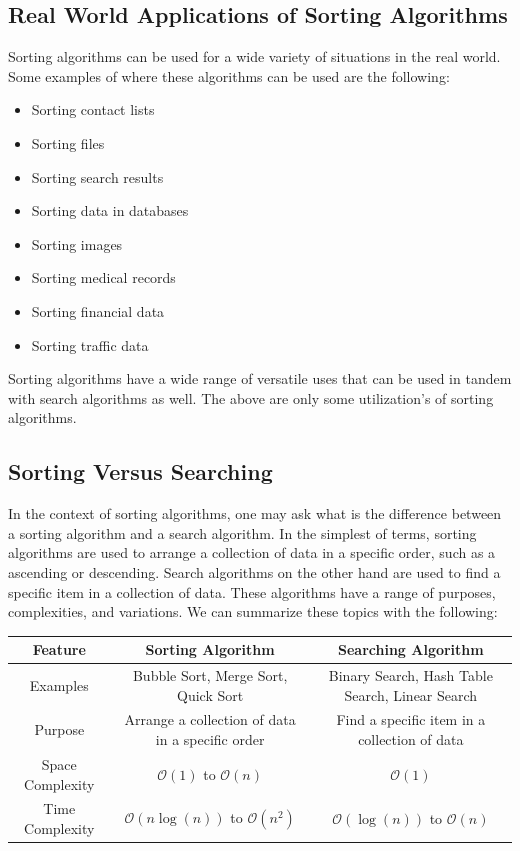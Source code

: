 \documentclass[a4paper,9pt]{article}
\begin{document}
\subsection*{Real World Applications of Sorting Algorithms}

Sorting algorithms can be used for a wide variety of situations in the real world. Some examples of where these algorithms can be used are the following:

\begin{itemize}
    \item Sorting contact lists
    \item Sorting files
    \item Sorting search results
    \item Sorting data in databases
    \item Sorting images
    \item Sorting medical records
    \item Sorting financial data
    \item Sorting traffic data
\end{itemize}

\noindent Sorting algorithms have a wide range of versatile uses that can be used in tandem with search algorithms as well. The above are only some utilization's of sorting algorithms.

\subsection*{Sorting Versus Searching}

In the context of sorting algorithms, one may ask what is the difference between a sorting algorithm and a search algorithm. In the simplest of terms, sorting algorithms are used to arrange a collection of data in a specific order, such as a ascending or descending. Search algorithms on the other hand are used to find a specific item in a collection of data. These algorithms have a range of purposes, complexities, and variations. We can summarize these topics with the following:

\begin{table}[ht]
    \centering
    \begin{tabular}{|c|c|c|}
    \hline \textbf{Feature} & \textbf{Sorting Algorithm} & \textbf{Searching Algorithm} \\ \hline
    Examples & Bubble Sort, Merge Sort, Quick Sort & Binary Search, Hash Table Search, Linear Search \\ \hline
    Purpose & Arrange a collection of data in a specific order & Find a specific item in a collection of data \\ \hline
    Space Complexity & $\mathcal{O}(1)$ to $\mathcal{O}(n)$ & $\mathcal{O}(1)$ \\ \hline
    Time Complexity & $\mathcal{O}(n\log{(n)})$ to $\mathcal{O}(n^2)$ & $\mathcal{O}(\log{(n)})$ to $\mathcal{O}(n)$ \\ \hline
    \end{tabular}
\end{table}
\end{document}
